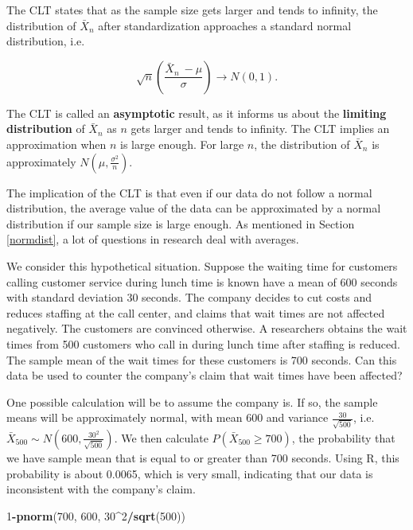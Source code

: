 \documentclass[
]{book}
\newenvironment{Shaded}{\begin{snugshade}}{\end{snugshade}}
\newcommand{\DecValTok}[1]{\textcolor[rgb]{0.00,0.00,0.81}{#1}}
\newcommand{\FunctionTok}[1]{\textcolor[rgb]{0.13,0.29,0.53}{\textbf{#1}}}
\newcommand{\NormalTok}[1]{#1}
\newcommand{\SpecialCharTok}[1]{\textcolor[rgb]{0.81,0.36,0.00}{\textbf{#1}}}
\begin{document}
The CLT states that as the sample size gets larger and tends to infinity, the distribution of \(\bar{X}_n\) after standardization approaches a standard normal distribution, i.e.

\begin{equation} 
\sqrt{n} \left(\frac{\bar{X}_n \ - \mu}{\sigma} \right) \to N(0,1).
\label{eq:6-CLT}
\end{equation}

The CLT is called an \textbf{asymptotic} result, as it informs us about the \textbf{limiting distribution} of \(\bar{X}_n\) as \(n\) gets larger and tends to infinity. The CLT implies an approximation when \(n\) is large enough. For large \(n\), the distribution of \(\bar{X}_n\) is approximately \(N(\mu, \frac{\sigma^2}{n})\).

The implication of the CLT is that even if our data do not follow a normal distribution, the average value of the data can be approximated by a normal distribution if our sample size is large enough. As mentioned in Section \ref{normdist}, a lot of questions in research deal with averages.

We consider this hypothetical situation. Suppose the waiting time for customers calling customer service during lunch time is known have a mean of 600 seconds with standard deviation 30 seconds. The company decides to cut costs and reduces staffing at the call center, and claims that wait times are not affected negatively. The customers are convinced otherwise. A researchers obtains the wait times from 500 customers who call in during lunch time after staffing is reduced. The sample mean of the wait times for these customers is 700 seconds. Can this data be used to counter the company's claim that wait times have been affected?

One possible calculation will be to assume the company is. If so, the sample means will be approximately normal, with mean 600 and variance \(\frac{30}{\sqrt{500}}\), i.e.~\(\bar{X}_{500} \sim N(600, \frac{30^2}{\sqrt{500}})\). We then calculate \(P(\bar{X}_{500} \geq 700)\), the probability that we have sample mean that is equal to or greater than 700 seconds. Using R, this probability is about 0.0065, which is very small, indicating that our data is inconsistent with the company's claim.

\begin{Shaded}
\begin{Highlighting}[]
\DecValTok{1}\SpecialCharTok{{-}}\FunctionTok{pnorm}\NormalTok{(}\DecValTok{700}\NormalTok{, }\DecValTok{600}\NormalTok{, }\DecValTok{30}\SpecialCharTok{\^{}}\DecValTok{2}\SpecialCharTok{/}\FunctionTok{sqrt}\NormalTok{(}\DecValTok{500}\NormalTok{))}
\end{Highlighting}
\end{Shaded}
\end{document}
